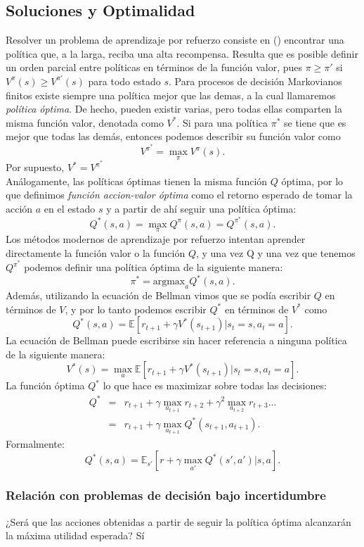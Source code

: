 \documentclass[11pt]{article}
\theoremstyle{plain}
\begin{document}
\subsection{Soluciones y Optimalidad}
Resolver un problema de aprendizaje por refuerzo consiste en (\cite{sutton1988learning}) encontrar una política que, a la larga, reciba una alta recompensa. Resulta que es posible definir un orden parcial entre políticas en términos de la función valor, pues $\pi \geq \pi'$ si $V^{\pi}(s) \geq V^{\pi'}(s)$ para todo estado $s$. Para procesos de decisión Markovianos finitos existe siempre una política mejor que las demas, a la cual llamaremos \textit{política óptima}. De hecho, pueden existir varias, pero todas ellas comparten la misma función valor, denotada como $V^\ast$. Si para una política $\pi^\ast$ se tiene que es mejor que todas las demás, entonces podemos describir su función valor como
\[  V^{\pi^\ast} = \max_{\pi} V^{\pi}(s).\]
Por supuesto, $V^\ast = V^{\pi^\ast}$
\\
Análogamente, las políticas óptimas tienen la misma función $Q$ óptima, por lo que definimos \textit{función accion-valor óptima} como el retorno esperado de tomar la acción $a$ en el estado $s$ y a partir de ahí seguir una política óptima:
\[ Q^\ast (s,a) = \max_\pi Q^{\pi}(s,a) = Q^{\pi^\ast}(s,a). \]
Los métodos modernos de aprendizaje por refuerzo intentan aprender directamente la función valor o la función $Q$, y una vez Q y una vez que tenemos $Q^{\pi^\ast}$ podemos definir una política óptima de la siguiente manera:
\[ \pi^\ast = \text{argmax}_a Q^\ast (s,a). \]
Además, utilizando la ecuación de Bellman vimos que se podía escribir $Q$ en términos de $V$, y por lo tanto podemos escribir $Q^\ast$ en términos de $V^\ast$ como
\[ Q^\ast (s,a) = \mathbb{E}[r_{t+1} + \gamma V^\ast (s_{t+1}) | s_t = s, a_t = a]. \]
La ecuación de Bellman puede escribirse sin hacer referencia a ninguna política de la siguiente manera:
\[ V^\ast (s) = \max_a \mathbb{E}[r_{t+1} + \gamma V^\ast (s_{t+1}) | s_t = s, a_t = a]. \]
La función óptima $ Q^\ast$ lo que hace es maximizar sobre todas las decisiones:
\begin{eqnarray*}
Q^\ast &=& r_{t+1} + \gamma \max_{a_{t+1}} r_{t+2} + \gamma^2 \max_{a_{t+2}} r_{t+3}...\\
&=& r_{t+1} + \gamma \max_{a_{t+1}} Q^{\ast} (s_{t+1},a_{t+1}).
\end{eqnarray*}
Formalmente:
\[ Q^\ast(s,a)=\mathbb{E}_{s'} [r + \gamma \max_{a'} Q^\ast(s',a')|s,a]. \]
\subsubsection{Relación con problemas de decisión bajo incertidumbre}
¿Será que las acciones obtenidas a partir de seguir la política óptima alcanzarán la máxima utilidad esperada? Sí
\end{document}
